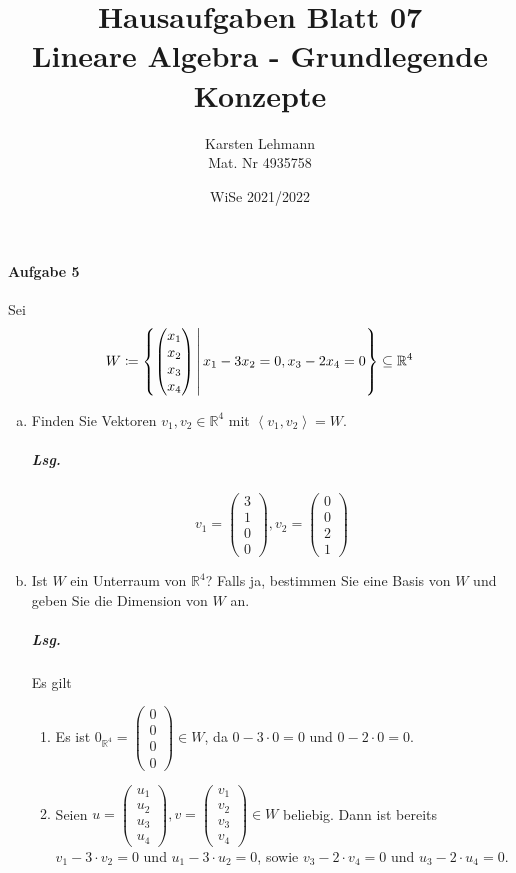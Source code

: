 \documentclass{scrreprt}
\author{Karsten Lehmann\\Mat. Nr 4935758}
\date{WiSe 2021/2022}
\title{Hausaufgaben Blatt 07\\Lineare Algebra - Grundlegende Konzepte}
\newcommand\hull[1]{\left\langle #1 \right\rangle}
\begin{document}
\paragraph{Aufgabe 5} Sei
\[
  W \coloneqq \qty{
    \begin{pmatrix}x_1 \\ x_2 \\ x_3 \\ x_4\end{pmatrix}
    \, \middle| \,
    x_1 - 3x_2 = 0, x_3 - 2x_4 = 0
  } \subseteq \mathbb{R}^4
\]
\begin{enumerate}[(a)]
\item Finden Sie Vektoren $v_1, v_2 \in \mathbb{R}^4$ mit $\hull{v_1, v_2} = W$.
  \subparagraph{Lsg.}
  \[
    v_1 = \begin{pmatrix}3 \\ 1 \\ 0 \\ 0\end{pmatrix},
    v_2 = \begin{pmatrix}0 \\ 0 \\ 2 \\ 1\end{pmatrix}
  \]
\item Ist $W$ ein Unterraum von $\mathbb{R}^4$?
  Falls ja, bestimmen Sie eine Basis von $W$ und geben Sie die Dimension von
  $W$ an.

  \subparagraph{Lsg.} Es gilt
  \begin{enumerate}[(1)]
  \item Es ist
    $0_{\mathbb{R}^4} = \begin{pmatrix}0 \\ 0 \\ 0 \\ 0\end{pmatrix} \in W$,
    da $0 - 3 \cdot 0 = 0$ und $0 - 2 \cdot 0 = 0$.

  \item Seien $u = \begin{pmatrix}u_1 \\ u_2 \\ u_3 \\ u_4\end{pmatrix},
    v = \begin{pmatrix}v_1 \\ v_2 \\ v_3 \\ v_4\end{pmatrix} \in W$ beliebig.
    Dann ist bereits $v_1 - 3 \cdot v_2 = 0$ und $u_1 - 3 \cdot u_2 = 0$, sowie
    $v_3 - 2 \cdot v_4 = 0$ und $u_3 - 2 \cdot u_4 = 0$.


\end{enumerate}
\end{enumerate}
\end{document}
